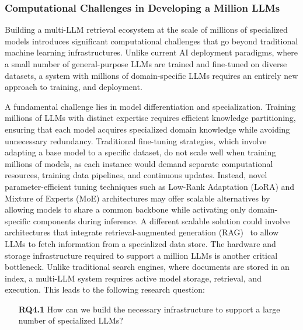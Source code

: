 \subsubsection{Computational Challenges in Developing a Million LLMs}
Building a multi-LLM retrieval ecosystem at the scale of millions of specialized models introduces significant computational challenges that go beyond traditional machine learning infrastructures. Unlike current AI deployment paradigms, where a small number of general-purpose LLMs are trained and fine-tuned on diverse datasets, a system with millions of domain-specific LLMs requires an entirely new approach to training, and deployment.

A fundamental challenge lies in model differentiation and specialization. Training millions of LLMs with distinct expertise requires efficient knowledge partitioning, ensuring that each model acquires specialized domain knowledge while avoiding unnecessary redundancy. Traditional fine-tuning strategies, which involve adapting a base model to a specific dataset, do not scale well when training millions of models, as each instance would demand separate computational resources, training data pipelines, and continuous updates. Instead, novel parameter-efficient tuning techniques such as Low-Rank Adaptation (LoRA)\cite{Hu2021LoRA} and Mixture of Experts (MoE) architectures\cite{Shazeer2017MoE} may offer scalable alternatives by allowing models to share a common backbone while activating only domain-specific components during inference. A different scalable solution could involve architectures that integrate retrieval-augmented generation (RAG)~\cite{Lewis2020RAG} to allow LLMs to fetch information from a specialized data store. The hardware and storage infrastructure required to support a million LLMs is another critical bottleneck. Unlike traditional search engines, where documents are stored in an index, a multi-LLM system requires active model storage, retrieval, and execution.  This leads to the following research question:

\begin{itemize}
    \item [\textbf{RQ4.1}] How can we build the necessary infrastructure to support a large number of specialized LLMs?
\end{itemize}

